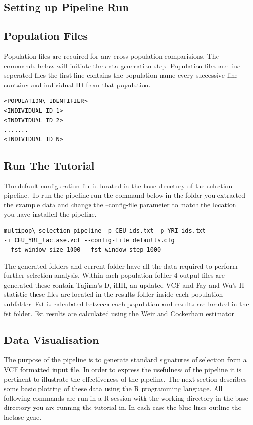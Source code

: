 \documentclass[a4paper,10pt]{article}
\begin{document}
\subsection{Setting up Pipeline Run}
\subsection{Population Files}
Population files are required for any cross population comparisions. The commands below will initiate the data generation step. Population files are line seperated files the first line contains the population name every successive line contains and individual ID from that population.\\
\begin{verbatim}
<POPULATION\_IDENTIFIER>
<INDIVIDUAL ID 1>
<INDIVIDUAL ID 2>
.......
<INDIVIDUAL ID N>
\end{verbatim}
\subsection{Run The Tutorial}
The default configuration file is located in the base directory of the selection pipeline. To run the pipeline run the command below in the folder you extracted the example data and change the --config-file parameter to match the location you have installed the pipeline.\\
\begin{verbatim}
multipop\_selection_pipeline -p CEU_ids.txt -p YRI_ids.txt 
-i CEU_YRI_lactase.vcf --config-file defaults.cfg
--fst-window-size 1000 --fst-window-step 1000
\end{verbatim}
The generated folders and current folder have all the data required to perform further selection analysis. Within each population folder 4 output files are generated these contain Tajima's D, iHH, an updated VCF and Fay and Wu's H statistic these files are located in the results folder inside each population subfolder. Fst is calculated between each population and results are located in the fst folder. Fst results are calculated using the Weir and Cockerham estimator.
\subsection{Data Visualisation}
The purpose of the pipeline is to generate standard signatures of selection from a VCF formatted input file. In order to express the usefulness of the pipeline it is pertinent to illustrate the effectiveness of the pipeline. The next section describes some basic plotting of these data using the R programming language. All following commands are run in a R session with the working directory in the base directory you are running the tutorial in. In each case the blue lines outline the lactase gene.
\end{document}
